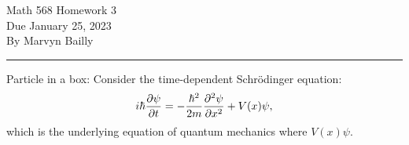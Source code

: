 \documentclass[12pt]{report}
\begin{document}
\large

\begin{center}
 Math 568 Homework 3\\
 Due January 25, 2023\\
 By Marvyn Bailly\\
\end{center}

\normalsize

\hrule



\begin{problem}
    Particle in a box: Consider the time-dependent Schr\"odinger equation:
    \[
        i\hbar \frac{\partial \psi}{\partial t} = - \frac{\hbar^2}{2m}\frac{\partial^{2} \psi}{\partial x^{2}} + V(x)\psi,
    \]
    which is the underlying equation of quantum mechanics where $V(x)\psi.$
\end{problem}
\end{document}
